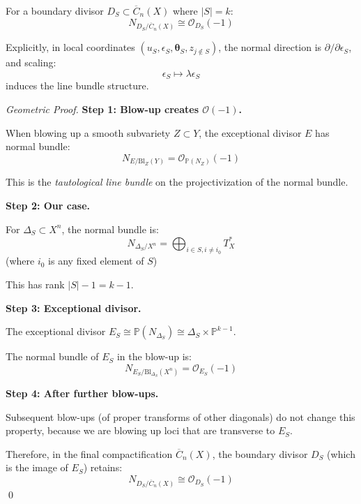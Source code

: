 \begin{theorem}\label{thm:normal-bundle-formula}
For a boundary divisor $D_S \subset \overline{C}_n(X)$ where $|S| = k$:
$$N_{D_S/\overline{C}_n(X)} \cong \mathcal{O}_{D_S}(-1)$$

Explicitly, in local coordinates $(u_S, \epsilon_S, \boldsymbol{\theta}_S, z_{j \notin S})$,
the normal direction is $\partial/\partial \epsilon_S$, and scaling:
$$\epsilon_S \mapsto \lambda \epsilon_S$$
induces the line bundle structure.
\end{theorem}

\begin{proof}[Geometric Proof]
\textbf{Step 1: Blow-up creates $\mathcal{O}(-1)$.}

When blowing up a smooth subvariety $Z \subset Y$, the exceptional divisor $E$ has normal
bundle:
$$N_{E/\text{Bl}_Z(Y)} = \mathcal{O}_{\mathbb{P}(N_Z)}(-1)$$

This is the \emph{tautological line bundle} on the projectivization of the normal bundle.

\textbf{Step 2: Our case.}

For $\Delta_S \subset X^n$, the normal bundle is:
$$N_{\Delta_S/X^n} = \bigoplus_{i \in S, i \neq i_0} T_X^*$$
(where $i_0$ is any fixed element of $S$)

This has rank $|S| - 1 = k - 1$.

\textbf{Step 3: Exceptional divisor.}

The exceptional divisor $E_S \cong \mathbb{P}(N_{\Delta_S}) \cong \Delta_S \times \mathbb{P}^{k-1}$.

The normal bundle of $E_S$ in the blow-up is:
$$N_{E_S/\text{Bl}_{\Delta_S}(X^n)} = \mathcal{O}_{E_S}(-1)$$

\textbf{Step 4: After further blow-ups.}

Subsequent blow-ups (of proper transforms of other diagonals) do not change this property,
because we are blowing up loci that are transverse to $E_S$.

Therefore, in the final compactification $\overline{C}_n(X)$, the boundary divisor $D_S$
(which is the image of $E_S$) retains:
$$N_{D_S/\overline{C}_n(X)} \cong \mathcal{O}_{D_S}(-1)$$
\qed
\end{proof}

